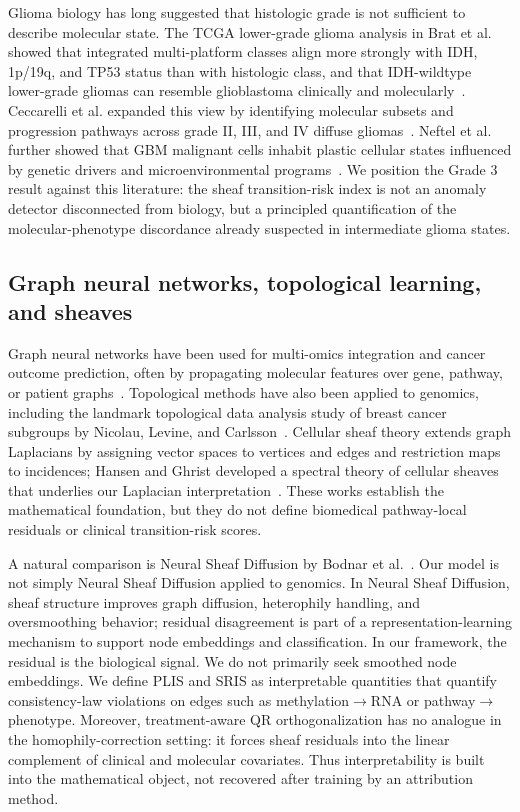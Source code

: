 \documentclass[conference]{IEEEtran}
\begin{document}
Glioma biology has long suggested that histologic grade is not sufficient to describe molecular state. The TCGA lower-grade glioma analysis in Brat et al. showed that integrated multi-platform classes align more strongly with IDH, 1p/19q, and TP53 status than with histologic class, and that IDH-wildtype lower-grade gliomas can resemble glioblastoma clinically and molecularly~\cite{brat2015}. Ceccarelli et al. expanded this view by identifying molecular subsets and progression pathways across grade II, III, and IV diffuse gliomas~\cite{ceccarelli2016}. Neftel et al. further showed that GBM malignant cells inhabit plastic cellular states influenced by genetic drivers and microenvironmental programs~\cite{neftel2019}. We position the Grade 3 result against this literature: the sheaf transition-risk index is not an anomaly detector disconnected from biology, but a principled quantification of the molecular-phenotype discordance already suspected in intermediate glioma states.

\subsection{Graph neural networks, topological learning, and sheaves}
Graph neural networks have been used for multi-omics integration and cancer outcome prediction, often by propagating molecular features over gene, pathway, or patient graphs~\cite{yao2022,li2022,mogdx2024}. Topological methods have also been applied to genomics, including the landmark topological data analysis study of breast cancer subgroups by Nicolau, Levine, and Carlsson~\cite{nicolau2011}. Cellular sheaf theory extends graph Laplacians by assigning vector spaces to vertices and edges and restriction maps to incidences; Hansen and Ghrist developed a spectral theory of cellular sheaves that underlies our Laplacian interpretation~\cite{hansen2019}. These works establish the mathematical foundation, but they do not define biomedical pathway-local residuals or clinical transition-risk scores.

A natural comparison is Neural Sheaf Diffusion by Bodnar et al.~\cite{bodnar2022}. Our model is not simply Neural Sheaf Diffusion applied to genomics. In Neural Sheaf Diffusion, sheaf structure improves graph diffusion, heterophily handling, and oversmoothing behavior; residual disagreement is part of a representation-learning mechanism to support node embeddings and classification. In our framework, the residual is the biological signal. We do not primarily seek smoothed node embeddings. We define PLIS and SRIS as interpretable quantities that quantify consistency-law violations on edges such as methylation$\to$RNA or pathway$\to$phenotype. Moreover, treatment-aware QR orthogonalization has no analogue in the homophily-correction setting: it forces sheaf residuals into the linear complement of clinical and molecular covariates. Thus interpretability is built into the mathematical object, not recovered after training by an attribution method.
\end{document}
